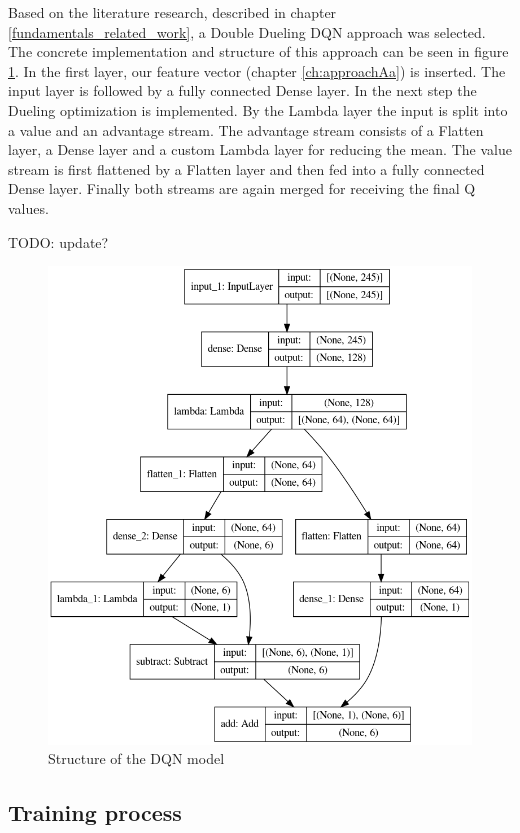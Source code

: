 Based on the literature research, described in chapter \ref{fundamentals_related_work}, a Double Dueling DQN approach was selected. The concrete implementation and structure of this approach can be seen in figure \ref{fig:model}.
In the first layer, our feature vector (chapter \ref{ch:approachAa}) is inserted. The input layer is followed by a fully connected Dense layer. In the next step the Dueling optimization is implemented. By the Lambda layer the input is split into a value and an advantage stream. 
The advantage stream consists of a Flatten layer, a Dense layer and a custom Lambda layer for reducing the mean.
The value stream is first flattened by a Flatten layer and then fed into a fully connected Dense layer.
Finally both streams are again merged for receiving the final Q values.

TODO: update?
\begin{figure}[ht]
	\centering
	\includegraphics[width=0.8\linewidth]{figures/model.png}
	\caption{Structure of the DQN model}
	\label{fig:model}
\end{figure}



\subsection{Training process} 
\label{ch:approachB}


